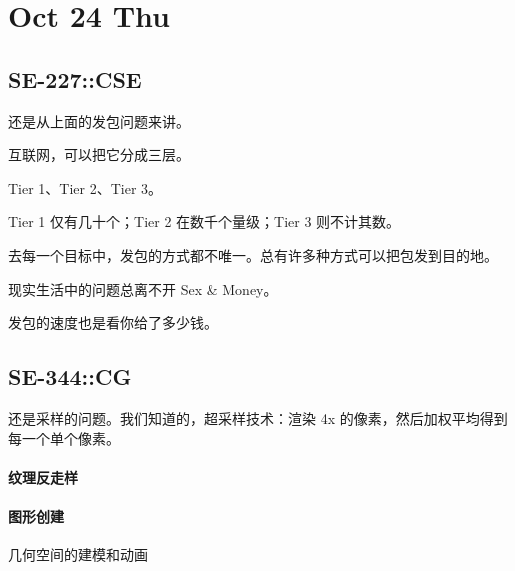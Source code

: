 \documentclass[
]{article}
\date{}
\begin{document}
\hypertarget{header-n0}{%
\section{Oct 24 Thu}\label{header-n0}}

\hypertarget{header-n2}{%
\subsection{SE-227::CSE}\label{header-n2}}

还是从上面的发包问题来讲。

互联网，可以把它分成三层。

Tier 1、Tier 2、Tier 3。

Tier 1 仅有几十个；Tier 2 在数千个量级；Tier 3 则不计其数。

去每一个目标中，发包的方式都不唯一。总有许多种方式可以把包发到目的地。

现实生活中的问题总离不开 Sex \& Money。

发包的速度也是看你给了多少钱。

\hypertarget{header-n10}{%
\subsection{SE-344::CG}\label{header-n10}}

还是采样的问题。我们知道的，超采样技术：渲染 4x
的像素，然后加权平均得到每一个单个像素。

\hypertarget{header-n12}{%
\paragraph{纹理反走样}\label{header-n12}}

\hypertarget{header-n13}{%
\paragraph{图形创建}\label{header-n13}}

几何空间的建模和动画
\end{document}
